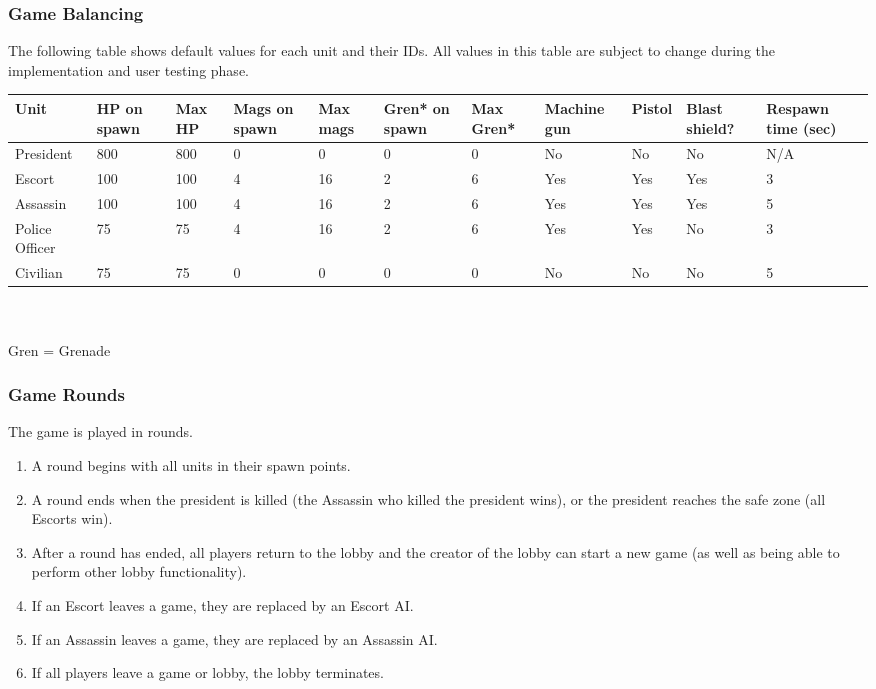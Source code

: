 \documentclass[12pt]{article}
\newenvironment{req} {\begin{enumerate}[leftmargin=2.5cm, label = \textbf{REQ \arabic{subsection}.\arabic{subsubsection}.\arabic*:}]} {\end{enumerate}}
\begin{document}
\subsubsection{Game Balancing}
The following table shows default values for each unit and their IDs. All values in this table are subject to change during the implementation and user testing phase.\\
\begin{tabularx}{\textwidth}{|X|p{1cm}|p{1cm}|p{1cm}|p{1cm}|p{1cm}|p{1cm}|p{1.5cm}|p{1cm}|p{1cm}|p{1.5cm}|}
\hline
Unit & HP on spawn & Max HP & Mags on spawn & Max mags & Gren* on spawn & Max Gren* & Machine gun & Pistol & Blast shield? & Respawn time (sec)\\ \hline
President		        & 800 & 800 & 0 & 0 & 0 & 0 & No & No & No & N/A\\ \hline
Escort    			   & 100 & 100 & 4 & 16 & 2 & 6 & Yes & Yes & Yes & 3\\ \hline
Assassin  & 100 & 100 & 4 & 16 & 2 & 6 & Yes & Yes & Yes & 5\\ \hline
Police Officer          & 75 & 75 & 4 & 16 & 2 & 6 & Yes & Yes & No & 3\\ \hline
Civilian               & 75 & 75 & 0 & 0 & 0 & 0 & No & No & No & 5\\ \hline 
\end{tabularx}
\\\\ \noindent *Gren = Grenade

\subsubsection{Game Rounds}
The game is played in rounds. 
\begin{req}
	\item A round begins with all units in their spawn points.
	\item A round ends when the president is killed (the Assassin who killed the president wins), or the president reaches the safe zone (all Escorts win).
	\item After a round has ended, all players return to the lobby and the creator  of the lobby can start a new game (as well as being able to perform other lobby functionality).
	\item If an Escort leaves a game, they are replaced by an Escort AI.
	\item If an Assassin leaves a game, they are replaced by an Assassin AI.
	\item If all players leave a game or lobby, the lobby terminates.
\end{req}
\end{document}
